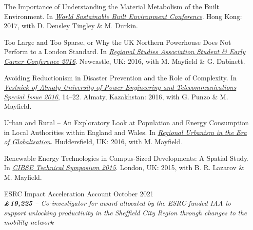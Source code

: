 \documentclass[10pt]{article}
\renewcommand{\section}[1]{\pagebreak[3]%
    \vspace{1.3\baselineskip}%
    \phantomsection\addcontentsline{toc}{section}{#1}%
    \noindent\llap{\large\smash{\parbox[t]{\marginparwidth}{\raggedright #1}}}%
    \vspace{-\baselineskip}\par}
\begin{document}
\begin{etaremune}[leftmargin=0ex, topsep=0ex]
	\item The Importance of Understanding the Material Metabolism of the Built Environment. In \emph{\href{https://www.wsbe17hongkong.hk/presentation-files}{World Sustainable Built Environment Conference}}. Hong Kong: 2017, with D. Densley Tingley \& M. Durkin.
	
	\item Too Large and Too Sparse, or Why the UK Northern Powerhouse Does Not Perform to a London Standard. In \emph{\href{https://www.regionalstudies.org/events/rsa-stud-ec-conf-2016/}{Regional Studies Association Student \& Early Career Conference 2016}}. Newcastle, UK: 2016, with M. Mayfield \& G. Dabinett. 
	
	\item Avoiding Reductionism in Disaster Prevention and the Role of Complexity. In \emph{\href{https://aues.kz/?page_id=10276\&lang=en}{Vestnick of Almaty University of Power Engineering and Telecommunications Special Issue 2016}}, 14--22. Almaty, Kazakhstan: 2016, with G. Punzo \& M. Mayfield. 
	
	\item Urban and Rural -- An Exploratory Look at Population and Energy Consumption in Local Authorities within England and Wales. In \emph{\href{https://research.hud.ac.uk/art-design/events/regional-urbanism/}{Regional Urbanism in the Era of Globalisation}}. Huddersfield, UK: 2016, with M. Mayfield.
	
	\item Renewable Energy Technologies in Campus-Sized Developments: A Spatial Study. In \emph{\href{https://www.cibse.org/Technical-Symposium-2015/Past-papers-case-studies-archive/2015}{CIBSE Technical Symposium 2015}}. London, UK: 2015, with B. R. Lazarov \& M. Mayfield.\label{y3sure}
\end{etaremune}
\section{Funding\\Awarded}%
ESRC Impact Acceleration Account \hfill {October 2021}\\
\emph{\textbf{\pounds19,225} -- Co-investigator for award allocated by the ESRC-funded IAA to support unlocking productivity in the Sheffield City Region through changes to the	mobility network}
\end{document}
